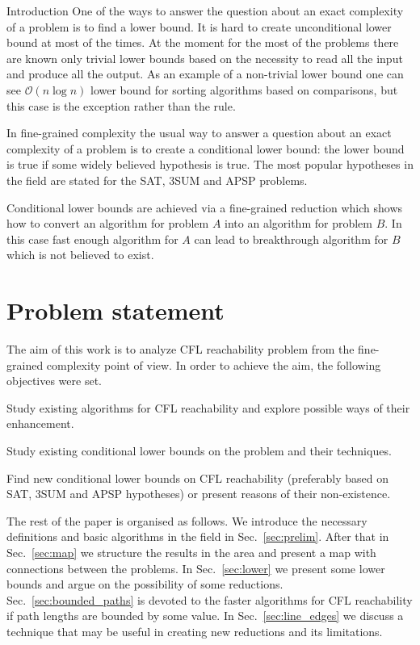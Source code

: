 \documentclass[12pt]{article}
\let\origenumerate\enumerate
\let\origendenumerate\endenumerate
\renewenvironment{enumerate}{\origenumerate[topsep = 0pt, noitemsep]}{\origendenumerate}
\begin{document}
\begin{section}{Introduction}
	One of the ways to answer the question about an exact complexity of a problem is to find a lower bound. It is hard to create unconditional lower bound at most of the times. At the moment for the most of the problems there are known only trivial lower bounds based on the necessity to read all the input and produce all the output. As an example of a non-trivial lower bound one can see $\mathcal{O}(n \log n)$ lower bound for sorting algorithms based on comparisons, but this case is the exception rather than the rule.
	
	In fine-grained complexity the usual way to answer a question about an exact complexity of a problem is to create a conditional lower bound: the lower bound is true if some widely believed hypothesis is true. The most popular hypotheses in the field are stated for the SAT, 3SUM and APSP problems.
	
	Conditional lower bounds are achieved via a fine-grained reduction which shows how to convert an algorithm for problem $A$ into an algorithm for problem $B$. In this case fast enough algorithm for $A$ can lead to breakthrough algorithm for $B$ which is not believed to exist. 

\end{section}

\section{Problem statement}

The aim of this work is to analyze CFL reachability problem from the fine-grained complexity point of view. In order to achieve the aim, the following objectives were set.

\begin{enumerate}
    \item Study existing algorithms for CFL reachability and explore possible ways of their enhancement.
    \item Study existing conditional lower bounds on the problem and their techniques.
    \item Find new conditional lower bounds on CFL reachability (preferably based on SAT, 3SUM and APSP hypotheses) or present reasons of their non-existence.
\end{enumerate}

The rest of the paper is organised as follows. We introduce the necessary definitions and basic algorithms in the field in Sec.~\ref{sec:prelim}. After that in Sec.~\ref{sec:map} we structure the results in the area and present a map with connections between the problems. In Sec.~\ref{sec:lower} we present some lower bounds and argue on the possibility of some reductions. Sec.~\ref{sec:bounded_paths} is devoted to the faster algorithms for CFL reachability if path lengths are bounded by some value. In Sec.~\ref{sec:line_edges} we discuss a technique that may be useful in creating new reductions and its limitations. 
\end{document}
